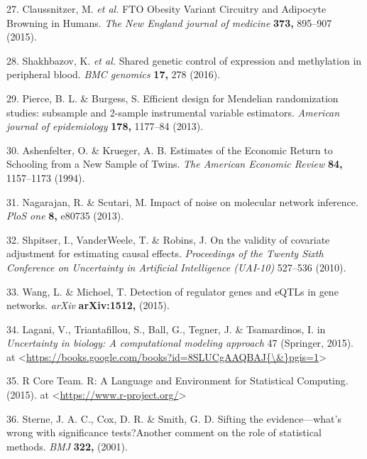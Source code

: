 \documentclass[]{article}
\begin{document}
\hypertarget{ref-Claussnitzer2015}{}
27. Claussnitzer, M. \emph{et al.} FTO Obesity Variant Circuitry and
Adipocyte Browning in Humans. \emph{The New England journal of medicine}
\textbf{373,} 895--907 (2015).

\hypertarget{ref-Shakhbazov2016}{}
28. Shakhbazov, K. \emph{et al.} Shared genetic control of expression
and methylation in peripheral blood. \emph{BMC genomics} \textbf{17,}
278 (2016).

\hypertarget{ref-Pierce2013}{}
29. Pierce, B. L. \& Burgess, S. Efficient design for Mendelian
randomization studies: subsample and 2-sample instrumental variable
estimators. \emph{American journal of epidemiology} \textbf{178,}
1177--84 (2013).

\hypertarget{ref-Ashenfelter1994}{}
30. Ashenfelter, O. \& Krueger, A. B. Estimates of the Economic Return
to Schooling from a New Sample of Twins. \emph{The American Economic
Review} \textbf{84,} 1157--1173 (1994).

\hypertarget{ref-Nagarajan2013}{}
31. Nagarajan, R. \& Scutari, M. Impact of noise on molecular network
inference. \emph{PloS one} \textbf{8,} e80735 (2013).

\hypertarget{ref-Shpitser2010}{}
32. Shpitser, I., VanderWeele, T. \& Robins, J. On the validity of
covariate adjustment for estimating causal effects. \emph{Proceedings of
the Twenty Sixth Conference on Uncertainty in Artificial Intelligence
(UAI-10)} 527--536 (2010).

\hypertarget{ref-Wang2015}{}
33. Wang, L. \& Michoel, T. Detection of regulator genes and eQTLs in
gene networks. \emph{arXiv} \textbf{arXiv:1512,} (2015).

\hypertarget{ref-Lagani2015}{}
34. Lagani, V., Triantafillou, S., Ball, G., Tegner, J. \& Tsamardinos,
I. in \emph{Uncertainty in biology: A computational modeling approach}
47 (Springer, 2015). at
\textless{}\href{https://books.google.com/books?id=8SLUCgAAQBAJ\%7B/\&\%7Dpgis=1}{https://books.google.com/books?id=8SLUCgAAQBAJ\{\textbackslash{}\&\}pgis=1}\textgreater{}

\hypertarget{ref-RCoreTeam2015}{}
35. R Core Team. R: A Language and Environment for Statistical
Computing. (2015). at
\textless{}\url{https://www.r-project.org/}\textgreater{}

\hypertarget{ref-Sterne2001}{}
36. Sterne, J. A. C., Cox, D. R. \& Smith, G. D. Sifting the
evidence---what's wrong with significance tests?Another comment on the
role of statistical methods. \emph{BMJ} \textbf{322,} (2001).
\end{document}
